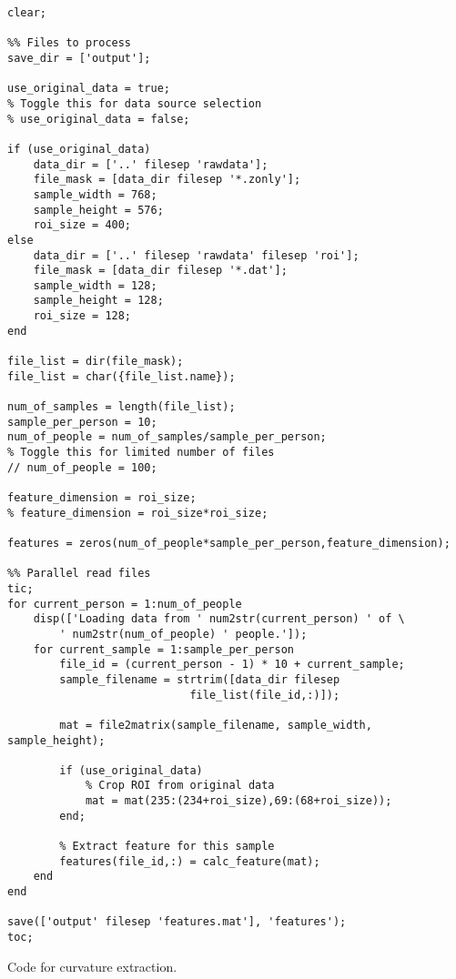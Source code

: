 \begin{verbatim}
clear;

%% Files to process
save_dir = ['output'];

use_original_data = true;
% Toggle this for data source selection
% use_original_data = false;

if (use_original_data)
    data_dir = ['..' filesep 'rawdata'];
    file_mask = [data_dir filesep '*.zonly'];
    sample_width = 768;
    sample_height = 576;
    roi_size = 400;
else
    data_dir = ['..' filesep 'rawdata' filesep 'roi'];
    file_mask = [data_dir filesep '*.dat'];
    sample_width = 128;
    sample_height = 128;
    roi_size = 128;
end

file_list = dir(file_mask);
file_list = char({file_list.name});

num_of_samples = length(file_list);
sample_per_person = 10;
num_of_people = num_of_samples/sample_per_person;
% Toggle this for limited number of files
// num_of_people = 100;

feature_dimension = roi_size;
% feature_dimension = roi_size*roi_size;

features = zeros(num_of_people*sample_per_person,feature_dimension);

%% Parallel read files
tic;
for current_person = 1:num_of_people
    disp(['Loading data from ' num2str(current_person) ' of \
		' num2str(num_of_people) ' people.']);
    for current_sample = 1:sample_per_person
        file_id = (current_person - 1) * 10 + current_sample;
        sample_filename = strtrim([data_dir filesep 
							file_list(file_id,:)]);
        
        mat = file2matrix(sample_filename, sample_width, sample_height);
        
        if (use_original_data)
            % Crop ROI from original data
            mat = mat(235:(234+roi_size),69:(68+roi_size));
        end;
        
        % Extract feature for this sample
        features(file_id,:) = calc_feature(mat);
    end
end

save(['output' filesep 'features.mat'], 'features');
toc;
\end{verbatim}
\clearpage

Code for curvature extraction.

